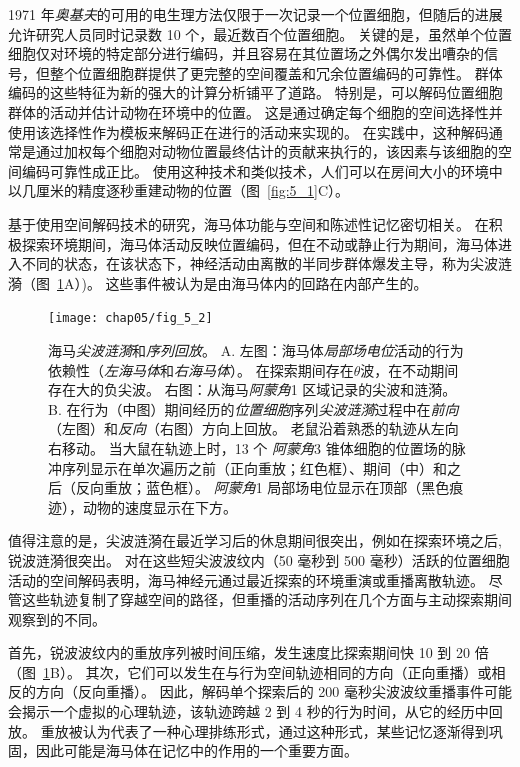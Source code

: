 1971 年\textit{奥基夫}的可用的电生理方法仅限于一次记录一个位置细胞，但随后的进展允许研究人员同时记录数 10 个，最近数百个位置细胞。
关键的是，虽然单个位置细胞仅对环境的特定部分进行编码，并且容易在其位置场之外偶尔发出嘈杂的信号，但整个位置细胞群提供了更完整的空间覆盖和冗余位置编码的可靠性。
群体编码的这些特征为新的强大的计算分析铺平了道路。
特别是，可以解码位置细胞群体的活动并估计动物在环境中的位置。
这是通过确定每个细胞的空间选择性并使用该选择性作为模板来解码正在进行的活动来实现的。
在实践中，这种解码通常是通过加权每个细胞对动物位置最终估计的贡献来执行的，该因素与该细胞的空间编码可靠性成正比。
使用这种技术和类似技术，人们可以在房间大小的环境中以几厘米的精度逐秒重建动物的位置（图~\ref{fig:5_1}C）。



基于使用空间解码技术的研究，海马体功能与空间和陈述性记忆密切相关。
在积极探索环境期间，海马体活动反映位置编码，但在不动或静止行为期间，海马体进入不同的状态，在该状态下，神经活动由离散的半同步群体爆发主导，称为尖波涟漪（图~\ref{fig:5_2}A）)。
这些事件被认为是由海马体内的回路在内部产生的。


\begin{figure}[htbp]
	\centering
	\texttt{[image: chap05/fig\_5\_2]}
	\caption{海马\textit{尖波涟漪}和\textit{序列回放}。 
		A. 左图：海马体\textit{局部场电位}活动的行为依赖性（\textit{左海马体}和\textit{右海马体}）。
		在探索期间存在$\theta$波，在不动期间存在大的负尖波。 
		右图：从海马\textit{阿蒙角}1 区域记录的尖波和涟漪\cite{buzsaki2015hippocampal,buzsaki1992high}。
		B. 在行为（中图）期间经历的\textit{位置细胞}序列\textit{尖波涟漪}过程中在\textit{前向}（左图）和\textit{反向}（右图）方向上回放。
		老鼠沿着熟悉的轨迹从左向右移动。
		当大鼠在轨迹上时，13 个 \textit{阿蒙角}3 锥体细胞的位置场的脉冲序列显示在单次遍历之前（正向重放；红色框）、期间（中）和之后（反向重放；蓝色框）。
		\textit{阿蒙角}1 局部场电位显示在顶部（黑色痕迹），动物的速度显示在下方\cite{diba2007forward}。}
	\label{fig:5_2}
\end{figure}


值得注意的是，尖波涟漪在最近学习后的休息期间很突出，例如在探索环境之后,锐波涟漪很突出。
对在这些短尖波波纹内（50 毫秒到 500 毫秒）活跃的位置细胞活动的空间解码表明，海马神经元通过最近探索的环境重演或重播离散轨迹。
尽管这些轨迹复制了穿越空间的路径，但重播的活动序列在几个方面与主动探索期间观察到的不同。


首先，锐波波纹内的重放序列被时间压缩，发生速度比探索期间快 10 到 20 倍（图~\ref{fig:5_2}B）。 
其次，它们可以发生在与行为空间轨迹相同的方向（正向重播）或相反的方向（反向重播）。
因此，解码单个探索后的 200 毫秒尖波波纹重播事件可能会揭示一个虚拟的心理轨迹，该轨迹跨越 2 到 4 秒的行为时间，从它的经历中回放。
重放被认为代表了一种心理排练形式，通过这种形式，某些记忆逐渐得到巩固，因此可能是海马体在记忆中的作用的一个重要方面。



